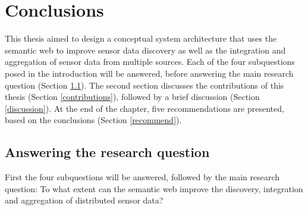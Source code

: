 

\chapter{Conclusions}
\label{chap:conclusion}

This thesis aimed to design a conceptual system architecture that uses the semantic web to improve sensor data discovery as well as the integration and aggregation of sensor data from multiple sources. Each of the four subquestions posed in the introduction will be answered, before answering the main research question (Section \ref{subquestions}). The second section discusses the contributions of this thesis (Section \ref{contributions}), followed by a brief discussion (Section \ref{discussion}). At the end of the chapter, five recommendations are presented, based on the conclusions (Section \ref{recommend}).

\section{Answering the research question}
\label{subquestions}

First the four subquestions will be answered, followed by the main research question: To what extent can the semantic web improve the discovery, integration and aggregation of distributed sensor data?

